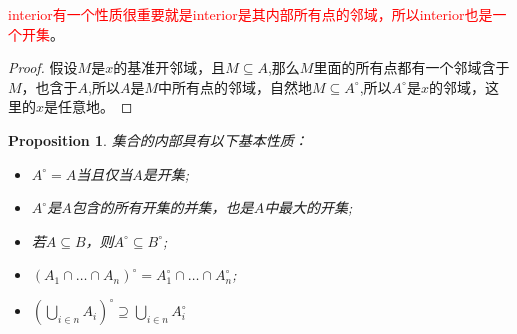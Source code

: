 \documentclass{article}
\newtheorem{proposition}[theorem]{Proposition}
\begin{document}
\textcolor{red}{interior有一个性质很重要就是interior是其内部所有点的邻域，所以interior也是一个开集}。

\begin{proof}
假设$M$是$x$的基准开邻域，且$M \subseteq A$,那么$M$里面的所有点都有一个邻域含于$M$，也含于$A$,所以$A$是$M$中所有点的邻域，自然地$M \subseteq A^{\circ}$,所以$A^{\circ}$是$x$的邻域，这里的$x$是任意地。
\end{proof}


\begin{proposition}
集合的内部具有以下基本性质：
\begin{itemize}
	\item $A^{\circ}=A$当且仅当$A$是开集;
	\item $A^{\circ}$是$A$包含的所有开集的并集，也是$A$中最大的开集;
	\item 若$A \subseteq B$，则$A^{\circ} \subseteq B^{\circ}$;
	\item $(A_1 \cap \ldots \cap A_n)^{\circ}=A_1^{\circ} \cap \ldots \cap A_n^{\circ}$;
	\item ${\left(\bigcup\limits_{i \in n} A_i\right)}^{\circ} \supseteq \bigcup\limits_{i \in n} A_i^{\circ}$
\end{itemize}
\end{proposition}
\end{document}
